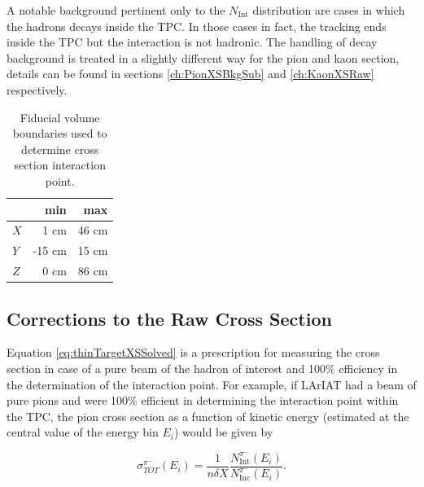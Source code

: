  A notable background pertinent only to the $N_{\text{Int}}$  distribution are cases in which the hadrons decays inside the TPC. In those cases in fact, the tracking ends inside the TPC but the interaction is not hadronic. The handling of decay background is treated in a slightly different way for the pion and kaon section, details can be found in sections \ref{ch:PionXSBkgSub} and \ref{ch:KaonXSRaw} respectively.



\begin{table}[t]
\centering
\begin{tabular}{|l|r|r|}
\hline
& min   &  max  \\ \hline
$X$ & 1 cm   & 46 cm  \\ \hline
$Y$ & -15 cm   & 15  cm  \\ \hline
$Z$ & 0 cm   & 86 cm  \\ \hline
\end{tabular}
\caption{Fiducial volume boundaries used to determine cross section interaction point. }
\label{tab:FidVol}
\end{table}



\subsection{Corrections to the Raw Cross Section}\label{ch:MCCorrections}
Equation \ref{eq:thinTargetXSSolved}  is a prescription for measuring the cross section in case of a pure beam of the hadron of interest and 100\% efficiency in the determination of the interaction point.  For example, if LArIAT had a beam of pure pions and were 100\% efficient in determining the interaction point within the TPC, the pion cross section as a function of  kinetic energy (estimated at the central value of the energy bin $E_i$) would be given by

\begin{equation}
 \sigma^{\pi^-}_{TOT}(E_{i})  = \frac{1}{n \delta X}\frac{N^{\pi^-}_{ \text{Int}} (E_{i})}{N^{\pi^-}_{ \text{Inc}}(E_{i})}.
\label{eq:thinTargetXSSolved2}
\end{equation}

